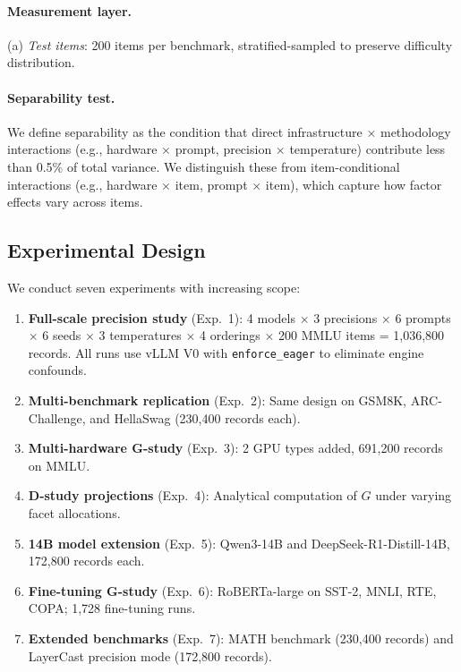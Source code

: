 \documentclass[letterpaper,11pt]{article}
\begin{document}
\paragraph{Measurement layer.}
(a) \emph{Test items}: 200 items per benchmark, stratified-sampled to preserve difficulty distribution.

\paragraph{Separability test.}
We define separability as the condition that direct infrastructure $\times$ methodology interactions (e.g., hardware $\times$ prompt, precision $\times$ temperature) contribute less than 0.5\% of total variance.
We distinguish these from item-conditional interactions (e.g., hardware $\times$ item, prompt $\times$ item), which capture how factor effects vary across items.

\subsection{Experimental Design}

We conduct seven experiments with increasing scope:

\begin{enumerate}
\item \textbf{Full-scale precision study} (Exp.~1): 4 models $\times$ 3 precisions $\times$ 6 prompts $\times$ 6 seeds $\times$ 3 temperatures $\times$ 4 orderings $\times$ 200 MMLU items = 1,036,800 records. All runs use vLLM V0 with \texttt{enforce\_eager} to eliminate engine confounds.
\item \textbf{Multi-benchmark replication} (Exp.~2): Same design on GSM8K, ARC-Challenge, and HellaSwag (230,400 records each).
\item \textbf{Multi-hardware G-study} (Exp.~3): 2 GPU types added, 691,200 records on MMLU.
\item \textbf{D-study projections} (Exp.~4): Analytical computation of $G$ under varying facet allocations.
\item \textbf{14B model extension} (Exp.~5): Qwen3-14B and DeepSeek-R1-Distill-14B, 172,800 records each.
\item \textbf{Fine-tuning G-study} (Exp.~6): RoBERTa-large on SST-2, MNLI, RTE, COPA; 1,728 fine-tuning runs.
\item \textbf{Extended benchmarks} (Exp.~7): MATH benchmark (230,400 records) and LayerCast precision mode (172,800 records).
\end{enumerate}
\end{document}
